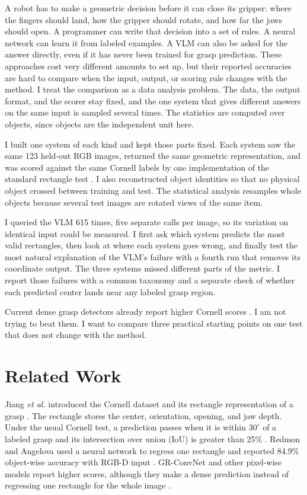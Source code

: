 \documentclass[10pt,conference,compsoc]{IEEEtran}
\begin{document}
A robot has to make a geometric decision before it can close its gripper:
where the fingers should land, how the gripper should rotate, and how far the
jaws should open. A programmer can write that decision into a set of rules. A
neural network can learn it from labeled examples. A VLM can also be asked for
the answer directly, even if it has never been trained for grasp prediction.
These approaches cost very different amounts to set up, but their reported
accuracies are hard to compare when the input, output, or scoring rule changes
with the method. I treat the comparison as a data analysis problem. The
data, the output format, and the scorer stay fixed, and the one system
that gives different answers on the same input is sampled several times.
The statistics are computed over objects, since objects are the independent
unit here.

I built one system of each kind and kept those parts fixed. Each system saw
the same 123 held-out RGB images, returned the same geometric representation,
and was scored against the same Cornell labels by one implementation of the
standard rectangle test \cite{jiang2011,lenz2015}. I also reconstructed
object identities so that no physical object crossed between training and
test. The statistical analysis resamples whole objects because several test
images are rotated views of the same item.

I queried the VLM 615 times, five separate calls per image, so its
variation on identical input could be measured. I first ask which system predicts the most valid
rectangles, then look at where each system goes wrong, and finally test the most natural explanation
of the VLM's failure with a fourth run that removes its coordinate output. The three systems missed different parts of the
metric. I report those failures with a common taxonomy and a separate check
of whether each predicted center lands near any labeled grasp region.

Current dense grasp detectors already report higher Cornell scores
\cite{kumra2020}. I am not trying to beat them. I want to compare three practical starting
points on one test that does not change with the method.

\section{Related Work}

Jiang \emph{et al.} introduced the Cornell dataset and its rectangle
representation of a grasp \cite{jiang2011}. The rectangle stores the center,
orientation, opening, and jaw depth. Under the usual Cornell test, a
prediction passes when it is within $30^\circ$ of a labeled grasp and its
intersection over union (IoU) is greater than 25\% \cite{lenz2015}. Redmon
and Angelova used a neural network to regress one rectangle and reported
84.9\% object-wise accuracy with RGB-D input \cite{redmon2015}. GR-ConvNet
and other pixel-wise models report higher scores, although they make a dense
prediction instead of regressing one rectangle for the whole image
\cite{kumra2020}.
\end{document}
